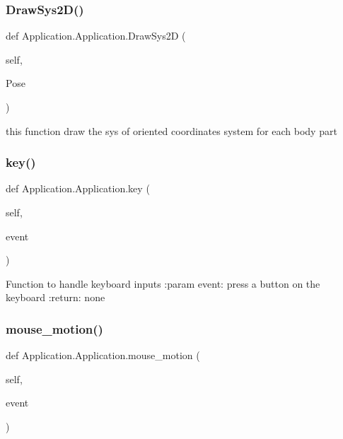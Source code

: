 \subsubsection{\texorpdfstring{Draw\+Sys2\+D()}{DrawSys2D()}}
{\footnotesize\ttfamily def Application.\+Application.\+Draw\+Sys2D (\begin{DoxyParamCaption}\item[{}]{self,  }\item[{}]{Pose }\end{DoxyParamCaption})}

\begin{DoxyVerb}this function draw the sys of oriented coordinates system for each body part\end{DoxyVerb}
 \mbox{\label{class_application_1_1_application_a7f10b75f569cab5769291c54ca1d3762}} 
\subsubsection{\texorpdfstring{key()}{key()}}
{\footnotesize\ttfamily def Application.\+Application.\+key (\begin{DoxyParamCaption}\item[{}]{self,  }\item[{}]{event }\end{DoxyParamCaption})}

\begin{DoxyVerb}Function to handle keyboard inputs
:param event: press a button on the keyboard
:return: none
\end{DoxyVerb}
 \mbox{\label{class_application_1_1_application_a1a6c84b431acbb546e466eaab2141e51}} 
\subsubsection{\texorpdfstring{mouse\+\_\+motion()}{mouse\_motion()}}
{\footnotesize\ttfamily def Application.\+Application.\+mouse\+\_\+motion (\begin{DoxyParamCaption}\item[{}]{self,  }\item[{}]{event }\end{DoxyParamCaption})}

